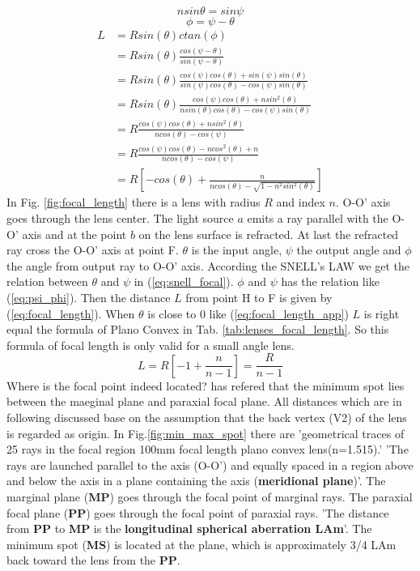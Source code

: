 \begin{equation}
nsin\theta=sin\psi
\label{eq:snell_focal}
\end{equation}
\begin{equation}
\phi=\psi-\theta
\label{eq:psi_phi}
\end{equation}
\begin{align}
L&=Rsin(\theta) ctan(\phi) \nonumber\\
&=Rsin(\theta)\frac{cos(\psi-\theta)}{ sin(\psi-\theta)} \nonumber\\
&= Rsin(\theta)\frac{cos(\psi)cos(\theta)+sin(\psi)sin(\theta)}{sin(\psi)cos(\theta)-cos(\psi)sin(\theta)} \nonumber\\
&= Rsin(\theta)\frac{cos(\psi)cos(\theta)+nsin^{2}(\theta)}{nsin(\theta)cos(\theta)-cos(\psi)sin(\theta)} \nonumber\\
&=R\frac{cos(\psi)cos(\theta)+nsin^{2}(\theta)}{ncos(\theta)-cos(\psi)} \nonumber\\
&=R\frac{cos(\psi)cos(\theta)-ncos^{2}(\theta)+n}{ncos(\theta)-cos(\psi)} \nonumber\\
&=R \left[-cos(\theta)+\frac{n}{ncos(\theta)-\sqrt{1-n^{2}sin^{2}(\theta)}} \right]
\label{eq:focal_length}
\end{align}
In Fig. \ref{fig:focal_length} there is a lens with radius $R$ and index $n$. O-O' axis goes through the lens center.  The light source $a$ emits a ray parallel with the O-O' axis and at the point $b$ on the lens surface is refracted. At last the refracted ray cross the O-O' axis at point F. $\theta$ is the input angle, $\psi$ the output angle and $\phi$ the angle from output ray to O-O' axis. According the SNELL's LAW we get the relation between $\theta$ and $\psi$ in (\ref{eq:snell_focal}). $\phi$ and $\psi$ has the relation like (\ref{eq:psi_phi}). Then the distance $L$ from point H to F is given by (\ref{eq:focal_length}). When $\theta$ is close to 0 like (\ref{eq:focal_length_app}) $L$ is right equal the formula of Plano Convex in Tab. \ref{tab:lenses_focal_length}. So this formula of focal length is only valid for a small angle lens. 
\begin{equation}
L=R\left[ -1+\frac{n}{n-1}\right]=\frac{R}{n-1}
\label{eq:focal_length_app}
\end{equation}
Where is the focal point indeed located? \cite{lens_theory_LC_Ltd} has refered that the minimum spot lies between the maeginal plane and paraxial focal plane. All distances which are in following discussed base on the assumption that the back vertex (V2) of the lens is regarded as origin. In Fig.\ref{fig:min_max_spot} there are 'geometrical traces of 25 rays in the focal region 100mm focal length plano convex lens(n=1.515).'  'The rays are launched parallel to the axis (O-O') and equally spaced in a region above and below the axis in a plane containing the axis (\textbf{meridional plane})'. The marginal plane (\textbf{MP}) goes through the focal point of marginal rays. The paraxial focal plane (\textbf{PP}) goes through the focal point of paraxial rays. 'The distance from \textbf{PP} to \textbf{MP} is the \textbf{longitudinal spherical aberration LAm}'. The minimum spot (\textbf{MS}) is located at the plane, which is approximately 3/4 LAm back toward the lens from the \textbf{PP}.\\

